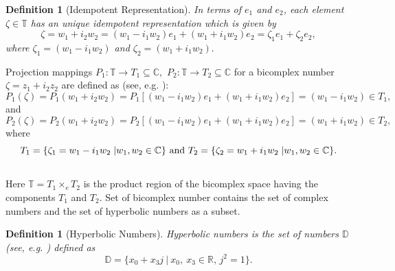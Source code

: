\documentclass[a4paper,12pt]{article}
\newtheorem{definition}[theorem]{Definition}
\theoremstyle{remark}
\begin{document}
\begin{definition}[Idempotent Representation]
In terms of $e_1$ and $e_2$, each element $\zeta\in \mathbb{T}$ has an unique idempotent representation which  is given by
\begin{equation}
\zeta = w_1 + i_2 w_2   = (w_1 - i_1 w_2) e_1 + (w_1 + i_1 w_2) e_2= \zeta_1 e_1 + \zeta_2 e_2,
\end{equation}  where  $\zeta_1 = (w_1 - i_1 w_2)$ and $\zeta_2 = (w_1 + i_1 w_2).$ 
\end{definition} 
\noindent Projection mappings  $P_1 : 	\mathbb{T} \rightarrow T_1 \subseteq \mathbb{C},$ $ P_2 : \mathbb{T} \rightarrow T_2 \subseteq \mathbb{C} $ for a bicomplex number $\zeta=z_1+i_2z_2$ are defined as  (see, e.g. \cite{rochon2004b}):\\
\begin{equation}\label{eq:p1}
P_1(\zeta)=	P_1(w_1 + i_2w_2) = P_1[(w_1 - i_1w_2)e_1 + (w_1 + i_1w_2)e_2] = (w_1 - i_1w_2) \in T_1,
\end{equation}
and
\begin{equation}\label{eq:p2}
P_2(\zeta)=P_2(w_1 + i_2w_2) = P_2[(w_1 -i_1w_2)e_1 + (w_1 + i_1w_2)e_2] = (w_1 + i_1w_2) \in T_2,
\end{equation}
where
\begin{equation}\label{eq:  a space A1}
T_1= \{\zeta_1= w_1-i_1w_2 \hspace{1mm}| w_1,w_2 \in \mathbb{C}\}~\text{and}~ 	T_2= \{\zeta_2= w_1+i_1w_2\hspace{1mm} | w_1,w_2 \in \mathbb{C}\}.
\end{equation}\\
Here $\mathbb{T} =T_1\times_e T_2 $ is the
product region of the bicomplex space having the components $T_1$ and $T_2.$
Set of bicomplex number contains the set of complex numbers and the set of hyperbolic numbers as a subset.
\begin{definition}[Hyperbolic Numbers]
	Hyperbolic numbers   is the set of numbers $\mathbb{D}$  (see, e.g. \cite{rochon2004b}) defined as
	\begin{equation}
	\mathbb{D} =\{x_0 +x_3j~|~x_0,~x_3 \in \mathbb{R},\, j^2=1 \}. 
		\end{equation}
\end{definition}
	 
\end{document}

